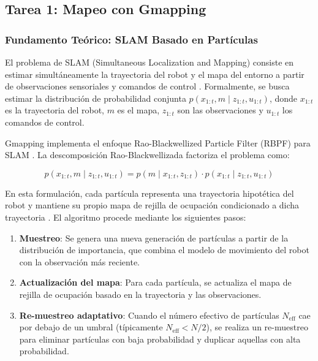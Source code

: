 \documentclass[12pt,letterpaper]{article}
\begin{document}
\subsection{Tarea 1: Mapeo con Gmapping}
\label{sec:gmapping}

\subsubsection{Fundamento Teórico: SLAM Basado en Partículas}

El problema de SLAM (Simultaneous Localization and Mapping) consiste en estimar simultáneamente la trayectoria del robot y el mapa del entorno a partir de observaciones sensoriales y comandos de control \citep{thrun2005probabilistic}. Formalmente, se busca estimar la distribución de probabilidad conjunta $p(x_{1:t}, m \mid z_{1:t}, u_{1:t})$, donde $x_{1:t}$ es la trayectoria del robot, $m$ es el mapa, $z_{1:t}$ son las observaciones y $u_{1:t}$ los comandos de control.

Gmapping implementa el enfoque Rao-Blackwellized Particle Filter (RBPF) para SLAM \citep{grisetti2007improved}. La descomposición Rao-Blackwellizada factoriza el problema como:

\begin{equation}
    p(x_{1:t}, m \mid z_{1:t}, u_{1:t}) = p(m \mid x_{1:t}, z_{1:t}) \cdot p(x_{1:t} \mid z_{1:t}, u_{1:t})
    \label{eq:rbpf}
\end{equation}

En esta formulación, cada partícula representa una trayectoria hipotética del robot y mantiene su propio mapa de rejilla de ocupación condicionado a dicha trayectoria \citep{montemerlo2007fastslam}. El algoritmo procede mediante los siguientes pasos:

\begin{enumerate}
    \item \textbf{Muestreo}: Se genera una nueva generación de partículas a partir de la distribución de importancia, que combina el modelo de movimiento del robot con la observación más reciente.
    \item \textbf{Actualización del mapa}: Para cada partícula, se actualiza el mapa de rejilla de ocupación basado en la trayectoria y las observaciones.
    \item \textbf{Re-muestreo adaptativo}: Cuando el número efectivo de partículas $N_{\text{eff}}$ cae por debajo de un umbral (típicamente $N_{\text{eff}} < N/2$), se realiza un re-muestreo para eliminar partículas con baja probabilidad y duplicar aquellas con alta probabilidad.
\end{enumerate}
\end{document}
